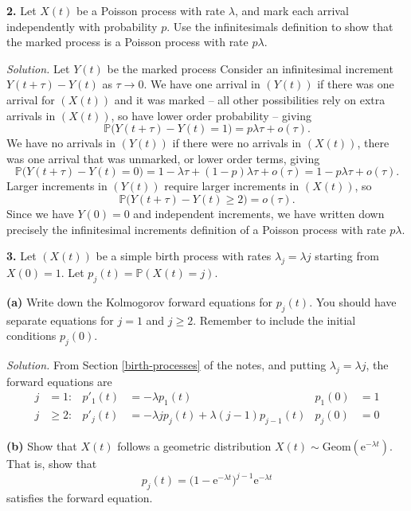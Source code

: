 \documentclass[
  a4paper,
]{article}
\theoremstyle{definition}
\theoremstyle{definition}
\theoremstyle{definition}
\theoremstyle{remark}
\begin{document}
\textbf{2.} Let \(X(t)\) be a Poisson process with rate \(\lambda\), and mark each arrival independently with probability \(p\). Use the infinitesimals definition to show that the marked process is a Poisson process with rate \(p\lambda\).

\begin{myanswers}
\emph{Solution.}
Let \(Y(t)\) be the marked process Consider an infinitesimal increment \(Y(t + \tau) - Y(t)\) as \(\tau \to 0\). We have one arrival in \((Y(t))\) if there was one arrival for \((X(t))\) and it was marked -- all other possibilities rely on extra arrivals in \((X(t))\), so have lower order probability -- giving
\[ \mathbb P \big( Y(t + \tau) - Y(t) = 1\big) = p\lambda \tau + o (\tau) .   \]
We have no arrivals in \((Y(t))\) if there were no arrivals in \((X(t))\), there was one arrival that was unmarked, or lower order terms, giving
\[ \mathbb P \big( Y(t + \tau) - Y(t) = 0 \big) = 1 - \lambda \tau + (1-p)\lambda \tau + o(\tau) = 1 - p\lambda \tau + o(\tau)  .   \]
Larger increments in \((Y(t))\) require larger increments in \((X(t))\), so
\[ \mathbb P \big( Y(t + \tau) - Y(t) \geq 2 \big) = o(\tau) . \]
Since we have \(Y(0) = 0\) and independent increments, we have written down precisely the infinitesimal increments definition of a Poisson process with rate \(p\lambda\).

\end{myanswers}

\textbf{3.} Let \((X(t))\) be a simple birth process with rates \(\lambda_j = \lambda j\) starting from \(X(0)=1\). Let \(p_j(t) = \mathbb P(X(t) = j)\).

\textbf{(a)} Write down the Kolmogorov forward equations for \(p_j(t)\). You should have separate equations for \(j = 1\) and \(j \geq 2\). Remember to include the initial conditions \(p_j(0)\).

\begin{myanswers}
\emph{Solution.}
From Section \ref{birth-processes} of the notes, and putting \(\lambda_j = \lambda j\), the forward equations are
\begin{align*}
    j &= 1\colon  &  p'_1(t) &= -\lambda  p_1(t) &  p_1(0) &= 1 \\
    j &\geq 2 \colon   &  p'_j(t) &= -\lambda j p_j(t) + \lambda (j-1)p_{j-1}(t)  &  p_j(0) &= 0
    \end{align*}

\end{myanswers}

\textbf{(b)} Show that \(X(t)\) follows a geometric distribution \(X(t) \sim \text{Geom} (\mathrm{e}^{-\lambda t})\). That is, show that
\[  p_j(t) = \big(1 - \mathrm{e}^{-\lambda t}\big)^{j-1}\mathrm{e}^{-\lambda t}   \]
satisfies the forward equation.
\end{document}
